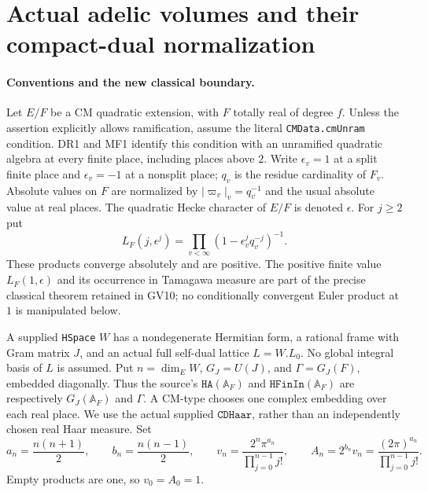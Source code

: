 \section{Actual adelic volumes and their compact-dual normalization}
\label{sec:geometric-volumes}


\paragraph{Conventions and the new classical boundary.}
Let $E/F$ be a CM quadratic extension, with $F$ totally real of degree
$f$. Unless the assertion explicitly allows ramification, assume the
literal \texttt{CMData.cmUnram} condition. DR1 and MF1 identify this
condition with an unramified quadratic algebra at every finite place,
including places above $2$. Write $\epsilon_v=1$ at a split finite
place and $\epsilon_v=-1$ at a nonsplit place; $q_v$ is the residue
cardinality of $F_v$. Absolute values on $F$ are normalized by
$|\varpi_v|_v=q_v^{-1}$ and the usual absolute value at real places.
The quadratic Hecke character of $E/F$ is denoted $\epsilon$.
For $j\ge2$ put
\[
 L_F(j,\epsilon^j)=\prod_{v<\infty}
                  (1-\epsilon_v^j q_v^{-j})^{-1}.
 \tag{GV.1}
\]
These products converge absolutely and are positive. The positive
finite value $L_F(1,\epsilon)$ and its occurrence in Tamagawa measure
are part of the precise classical theorem retained in GV10; no
conditionally convergent Euler product at $1$ is manipulated below.

A supplied \texttt{HSpace} $W$ has a nondegenerate Hermitian form,
a rational frame with Gram matrix $J$, and an actual full self-dual
lattice $L=W.L_0$. No global integral basis of $L$ is assumed. Put
$n=\dim_E W$, $G_J=U(J)$, and $\Gamma=G_J(F)$, embedded diagonally.
Thus the source's $\texttt{HA}(\mathbb A_F)$ and
$\texttt{HFinIn}(\mathbb A_F)$ are respectively
$G_J(\mathbb A_F)$ and $\Gamma$. A CM-type chooses one complex
embedding over each real place. We use the actual supplied
$\texttt{CDHaar}$, rather than an independently chosen real Haar
measure. Set
\[
 a_n=\frac{n(n+1)}2,\qquad b_n=\frac{n(n-1)}2,\qquad
 v_n=\frac{2^n\pi^{a_n}}{\prod_{j=0}^{n-1}j!},\qquad
 A_n=2^{b_n}v_n=\frac{(2\pi)^{a_n}}{\prod_{j=0}^{n-1}j!}.
 \tag{GV.2}
\]
Empty products are one, so $v_0=A_0=1$.

